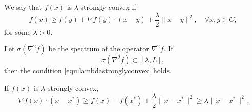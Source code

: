 \begin{definition}\label{def:strongconvex}
We say that $f(x)$ is $\lambda$-strongly convex if
	\begin{equation}\label{equ:lambdastronglyconvex}
	f(x)  \ge f(y) + \nabla f(y)\cdot(x-y) + \frac{\lambda}{2}\|x-y\|^2, \quad \forall x, y \in C,
	\end{equation}
	for some $\lambda >0$.
\end{definition} 
\begin{lemma}
Let $\sigma(\nabla^2f)$ be the spectrum of the operator $\nabla^2 f$. If
$$
\sigma(\nabla^2f)\subset [\lambda, L],
$$ 
then the condition \eqref{equ:lambdastronglyconvex} holds.
\end{lemma}

\begin{lemma} 
If $f(x)$ is $\lambda$-strongly convex,
	\begin{equation}\label{strongConvIneq}
		\nabla f(x)\cdot(x - x^*) \ge f(x) - f(x^*) +\frac{\lambda}{2}\|x - x^*\|^2\ge \lambda \|x - x^*\|^2.
		\end{equation} 
\end{lemma}

